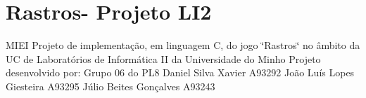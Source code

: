 \section*{Rastros-\/ Projeto L\+I2}

M\+I\+EI Projeto de implementação, em linguagem C, do jogo \char`\"{}\+Rastros\char`\"{} no âmbito da UC de Laboratórios de Informática II da Universidade do Minho  Projeto desenvolvido por\+:  Grupo 06 do P\+L8  Daniel Silva Xavier A93292  João Luís Lopes Giesteira A93295  Júlio Beites Gonçalves A93243 